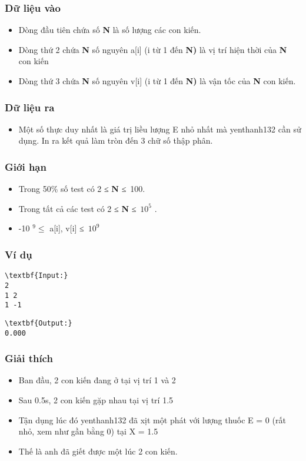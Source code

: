 \subsubsection{\textbf{Dữ liệu vào }}
\begin{itemize}
	\item Dòng đầu tiên chứa số \textbf{ N } là số lượng các con kiến.
	\item Dòng thứ 2 chứa \textbf{ N } số nguyên a[i] (i từ 1 đến \textbf{ N) } là vị trí hiện thời của \textbf{ N } con kiến
	\item Dòng thứ 3 chứa \textbf{ N } số nguyên v[i] (i từ 1 đến \textbf{ N) } là vận tốc của \textbf{ N } con kiến.
\end{itemize}

\subsubsection{\textbf{Dữ liệu ra }}
\begin{itemize}
	\item Một số thực duy nhất là giá trị liều lượng E nhỏ nhất mà yenthanh132 cần sử dụng. In ra kết quả làm tròn đến 3 chữ số thập phân.
\end{itemize}

\subsubsection{Giới hạn}
\begin{itemize}
	\item Trong 50\% số test có 2 ≤ \textbf{ N } ≤ 100.
	\item Trong tất cả các test có 2 ≤ \textbf{ N } ≤ $10^{5}$ .
	\item -10 $^ 9 ≤ $ a[i], v[i] ≤ $10^{9}$
\end{itemize}
\begin{itemize}
\end{itemize}

\subsubsection{\textbf{Ví dụ }}
\begin{verbatim}
\textbf{Input:}
2
1 2
1 -1
\end{verbatim}
\begin{verbatim}
\textbf{Output:}
0.000\end{verbatim}

\subsubsection{Giải thích}
\begin{itemize}
	\item Ban đầu, 2 con kiến đang ở tại vị trí 1 và 2
	\item Sau 0.5s, 2 con kiến gặp nhau tại vị trí 1.5
	\item Tận dụng lúc đó yenthanh132 đã xịt một phát với lượng thuốc E = 0 (rất nhỏ, xem như gần bằng 0) tại X = 1.5
	\item Thế là anh đã giết được một lúc 2 con kiến.
\end{itemize}
